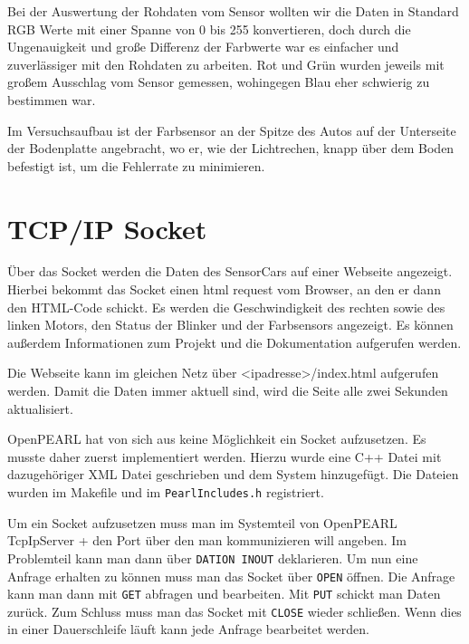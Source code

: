 Bei der Auswertung der Rohdaten vom Sensor wollten wir die Daten in Standard RGB Werte mit einer Spanne von 0 bis 255 konvertieren, doch durch die Ungenauigkeit und große Differenz der Farbwerte war es einfacher und zuverlässiger mit den Rohdaten zu arbeiten. Rot und Grün wurden jeweils mit großem Ausschlag vom Sensor gemessen, wohingegen Blau eher schwierig zu bestimmen war.

Im Versuchsaufbau ist der Farbsensor an der Spitze des Autos auf der Unterseite der Bodenplatte angebracht, wo er, wie der Lichtrechen, knapp über dem Boden befestigt ist, um die Fehlerrate zu minimieren.

\section{TCP/IP Socket}
Über das Socket werden die Daten des SensorCars auf einer Webseite angezeigt. Hierbei bekommt das Socket einen html request vom Browser, an den er dann den HTML-Code schickt. Es werden die Geschwindigkeit des rechten sowie des linken Motors, den Status der Blinker und der Farbsensors angezeigt. Es können außerdem Informationen zum Projekt und die Dokumentation aufgerufen werden. 

Die Webseite kann im gleichen Netz über <ipadresse>/index.html aufgerufen werden. Damit die Daten immer aktuell sind, wird die Seite alle zwei Sekunden aktualisiert.

OpenPEARL hat von sich aus keine Möglichkeit ein Socket aufzusetzen. Es musste daher zuerst implementiert werden. Hierzu wurde eine C++ Datei mit dazugehöriger XML Datei geschrieben und dem System hinzugefügt. Die Dateien wurden im Makefile und im \texttt{PearlIncludes.h} registriert. 

Um ein Socket aufzusetzen muss man im Systemteil von OpenPEARL TcpIpServer + den Port über den man kommunizieren will angeben. Im Problemteil kann man dann über \texttt{DATION INOUT} deklarieren. Um nun eine Anfrage erhalten zu können muss man das Socket über \texttt{OPEN} öffnen. Die Anfrage kann man dann mit \texttt{GET} abfragen und bearbeiten. Mit \texttt{PUT} schickt man Daten zurück. Zum Schluss muss man das Socket mit \texttt{CLOSE}  wieder schließen. Wenn dies in einer Dauerschleife läuft kann jede Anfrage bearbeitet werden. 
